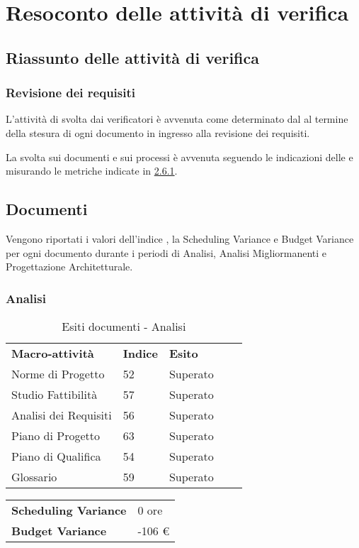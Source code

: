 \newpage
\section{Resoconto delle attività di verifica} \label{App:AppendixA}
	\subsection{Riassunto delle attività di verifica} \label{App:AppendixA}
		\subsubsection{Revisione dei requisiti} \label{App:AppendixA}
			
			L'attività di  svolta dai verificatori è avvenuta come determinato dal \PianoDiProgetto al termine della stesura di ogni documento in ingresso alla revisione dei requisiti.
			
			La  svolta sui documenti e sui processi è avvenuta seguendo le indicazioni delle \NormeDiProgetto e misurando le metriche indicate in \hyperlink{metriche_documenti}{2.6.1}.
\subsection{Documenti} \label{App:AppendixB}
Vengono riportati i valori dell’indice , la Scheduling Variance e Budget Variance per ogni documento durante i periodi di Analisi, Analisi Migliormanenti e Progettazione Architetturale. 
\subsubsection{Analisi}
		\begin{table}[!ht]
			\centering
				\begin{tabular}{|l|l|l|ll}
					\cline{1-3}
					 \textbf{Macro-attività}  & \textbf{Indice \glossaryItem{Gulpease}}  & \textbf{Esito}  &  \\ \cline{1-3}
					 Norme di Progetto  & 52 & Superato &  \\ \cline{1-3}
					 Studio Fattibilità & 57 & Superato &  \\ \cline{1-3}
					 Analisi dei Requisiti & 56 & Superato &  \\ \cline{1-3}
					 Piano di Progetto & 63 & Superato &  \\ \cline{1-3}
					 Piano di Qualifica & 54 & Superato &  \\ \cline{1-3}
					 Glossario & 59 & Superato &  \\ \cline{1-3}
				\end{tabular}
				\caption{Esiti  documenti - Analisi}
		\end{table}
		\begin{table}[!ht]
		\centering
		\begin{tabular}{l|l}
		\textbf{Scheduling Variance} & 0 ore \\
		\textbf{Budget Variance} & -106 \euro{} \\
		\end{tabular}
		\end{table}

